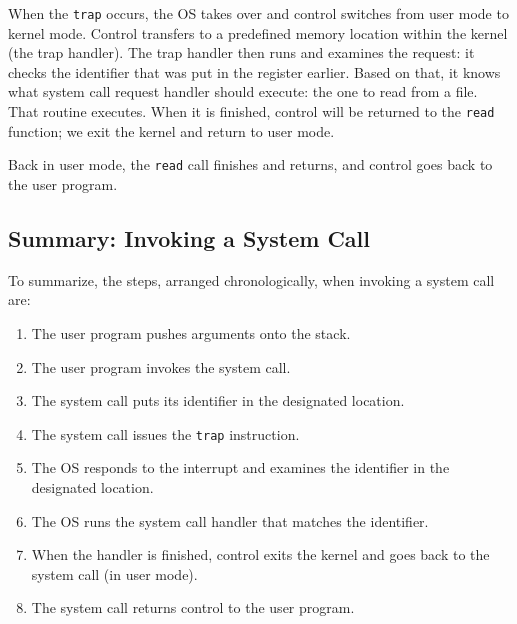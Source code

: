 When the \texttt{trap} occurs, the OS takes over and control switches from user mode to kernel mode. Control transfers to a predefined memory location within the kernel (the trap handler). The trap handler then runs and examines the request: it checks the identifier that was put in the register earlier. Based on that, it knows what system call request handler should execute: the one to read from a file. That routine executes. When it is finished, control will be returned to the \texttt{read} function; we exit the kernel and return to user mode.

Back in user mode, the \texttt{read} call finishes and returns, and control goes back to the user program.

\subsection*{Summary: Invoking a System Call}

To summarize, the steps, arranged chronologically, when invoking a system call are:
\begin{enumerate}
	\item The user program pushes arguments onto the stack.
	\item The user program invokes the system call.
	\item The system call puts its identifier in the designated location.
	\item The system call issues the \texttt{trap} instruction.
	\item The OS responds to the interrupt and examines the identifier in the designated location.
	\item The OS runs the system call handler that matches the identifier.
	\item When the handler is finished, control exits the kernel and goes back to the system call (in user mode).
	\item The system call returns control to the user program.

\end{enumerate}








